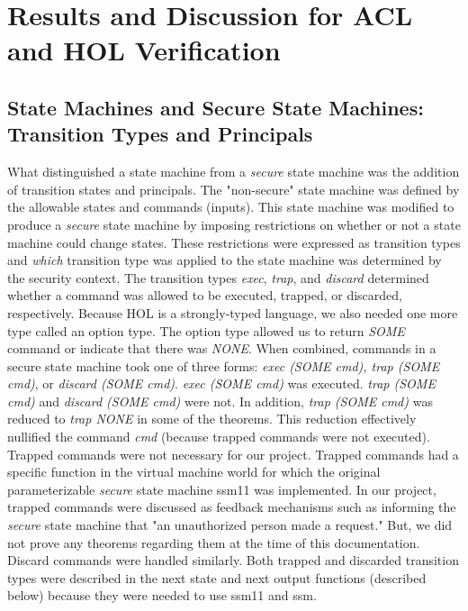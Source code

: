 \chapter{Results and Discussion for ACL and HOL Verification}
\label{cha:results-disc-acl}

\section{State Machines and Secure State Machines: Transition Types and Principals}
\label{sec:state-mach-secure}



What distinguished a state machine from a \emph{secure} state machine was the addition of transition states and principals.  The "non-secure" state machine was defined by the allowable states and commands (inputs).  This state machine was modified to produce a \emph{secure} state machine by imposing restrictions on whether or not a state machine could change states. These restrictions were expressed as transition types and \emph{which} transition type was applied to the state machine was determined by the security context.  The transition types \emph{exec}, \emph{trap}, and \emph{discard} determined whether a command was allowed to be executed, trapped, or discarded, respectively.  Because HOL is a strongly-typed language, we also needed one more type called an option type.  The option type allowed us to return \emph{SOME} command or indicate that there was \emph{NONE}.  When combined, commands in a secure state machine took one of three forms: \emph{exec (SOME cmd), trap (SOME cmd)}, or \emph{discard (SOME cmd)}.  \emph{exec (SOME cmd)} was executed.  \emph{trap (SOME cmd)} and \emph{discard (SOME cmd)} were not.  In addition, \emph{trap (SOME cmd)} was reduced to \emph{trap NONE} in some of the theorems.  This reduction effectively nullified the command \emph{cmd} (because trapped commands were not executed).\\
  
Trapped commands were not necessary for our project.  Trapped commands had a specific function in the virtual machine world for which the original parameterizable \emph{secure} state machine ssm11 was implemented.  In our project, trapped commands were discussed as feedback mechanisms such as informing the \emph{secure} state machine that "an unauthorized person made a request."  But, we did not prove any theorems regarding them at the time of this documentation.  Discard commands were handled similarly.  Both trapped and discarded transition types were described in the next state and next output functions (described below) because they were needed to use ssm11 and ssm.  \\
  
